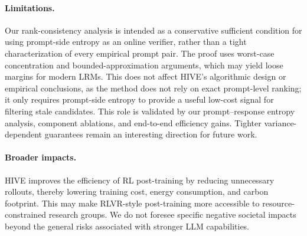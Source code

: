 \paragraph{Limitations.} 
Our rank-consistency analysis is intended as a conservative sufficient condition for using prompt-side entropy as an online verifier, rather than a tight characterization of every empirical prompt pair. The proof uses worst-case concentration and bounded-approximation arguments, which may yield loose margins for modern LRMs. This does not affect HIVE's algorithmic design or empirical conclusions, as the method does not rely on exact prompt-level ranking; it only requires prompt-side entropy to provide a useful low-cost signal for filtering stale candidates. This role is validated by our prompt--response entropy analysis, component ablations, and end-to-end efficiency gains. Tighter variance-dependent guarantees remain an interesting direction for future work.
\paragraph{Broader impacts.} 
HIVE improves the efficiency of RL post-training by reducing unnecessary rollouts, thereby lowering training cost, energy consumption, and carbon footprint. This may make RLVR-style post-training more accessible to resource-constrained research groups. We do not foresee specific negative societal impacts beyond the general risks associated with stronger LLM capabilities.
